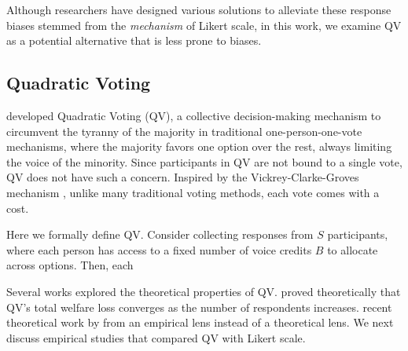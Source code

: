 Although researchers have designed various solutions to alleviate these response biases stemmed from the \textit{mechanism} of Likert scale, in this work, we examine QV as a potential alternative that is less prone to {} biases.

\subsection{Quadratic Voting}
\textcite{posner2018radical} developed Quadratic Voting (QV), a collective decision-making mechanism \cite{lalley2018quadratic} to circumvent the tyranny of the majority in traditional one-person-one-vote mechanisms, where the majority favors one option over the rest, always limiting the voice of the minority. Since participants in QV are not bound to a single vote, QV does not have such a concern. Inspired by the Vickrey-Clarke-Groves mechanism \cite{roughgarden2010algorithmic}, {} unlike many traditional voting methods, each {} vote comes with a {} cost. 

Here we formally define QV. Consider collecting responses from $S$ participants, where each person has access to a fixed number of voice credits $B$ to allocate across options. Then, each {}

Several works explored the theoretical properties of QV. \textcite{lalley2018quadratic} proved theoretically that QV's total welfare loss converges as the number of respondents increases. {} recent theoretical work by \textcite{eguia2019quadratic} {} from an empirical lens instead of a theoretical lens. We next discuss empirical studies that compared QV with Likert scale.

